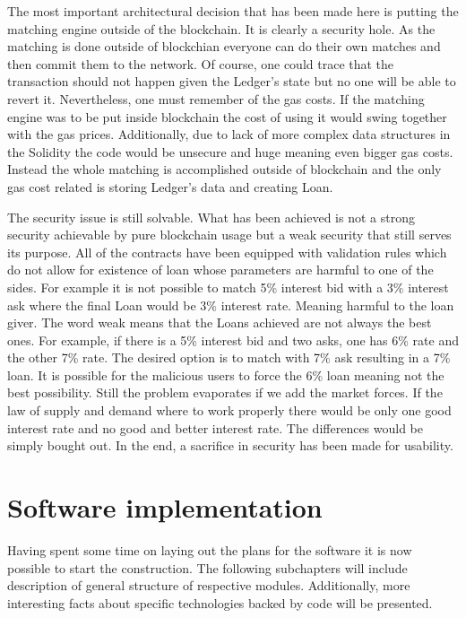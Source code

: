 \documentclass[a4paper,12pt,twoside,openany]{report}
\begin{document}
The most important architectural decision that has been made here is putting the matching engine outside of the blockchain. It is clearly a security hole. As the matching is done outside of blockchian everyone can do their own matches and then commit them to the network. Of course, one could trace that the transaction should not happen given the Ledger's state but no one will be able to revert it. Nevertheless, one must remember of the gas costs. If the matching engine was to be put inside blockchain the cost of using it would swing together with the gas prices. Additionally, due to lack of more complex data structures in the Solidity the code would be unsecure and huge meaning even bigger gas costs. Instead the whole matching is accomplished outside of blockchain and the only gas cost related is storing Ledger's data and creating Loan. 

The security issue is still solvable. What has been achieved is not a strong security achievable by pure blockchain usage but a weak security that still serves its purpose. All of the contracts have been equipped with validation rules which do not allow for existence of loan whose parameters are harmful to one of the sides. For example it is not possible to match 5\% interest bid with a 3\% interest ask where the final Loan would be 3\% interest rate. Meaning harmful to the loan giver. The word weak means that the Loans achieved are not always the best ones. For example, if there is a 5\% interest bid and two asks, one has 6\% rate and the other 7\% rate. The desired option is to match with 7\% ask resulting in a 7\% loan. It is possible for the malicious users to force the 6\% loan meaning not the best possibility. Still the problem evaporates if we add the market forces. If the law of supply and demand where to work properly there would be only one good interest rate and no good and better interest rate. The differences would be simply bought out. In the end, a sacrifice in security has been made for usability.

\chapter{Software implementation}

Having spent some time on laying out the plans for the software it is now possible to start the construction. The following subchapters will include description of general structure of respective modules. Additionally, more interesting facts about specific technologies backed by code will be presented.
\end{document}
